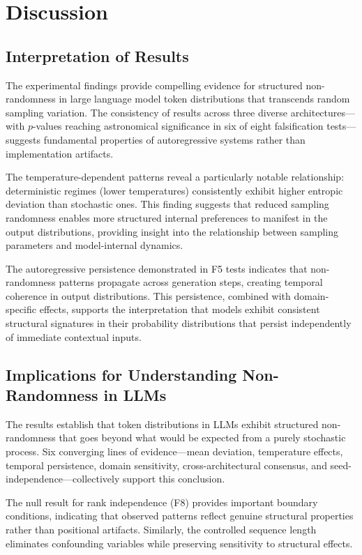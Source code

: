 \documentclass[12pt]{article}
\begin{document}
\section{Discussion}

\subsection{Interpretation of Results}

The experimental findings provide compelling evidence for structured non-randomness in large language model token distributions that transcends random sampling variation. The consistency of results across three diverse architectures---with $p$-values reaching astronomical significance in six of eight falsification tests---suggests fundamental properties of autoregressive systems rather than implementation artifacts.

The temperature-dependent patterns reveal a particularly notable relationship: deterministic regimes (lower temperatures) consistently exhibit higher entropic deviation than stochastic ones. This finding suggests that reduced sampling randomness enables more structured internal preferences to manifest in the output distributions, providing insight into the relationship between sampling parameters and model-internal dynamics.

The autoregressive persistence demonstrated in F5 tests indicates that non-randomness patterns propagate across generation steps, creating temporal coherence in output distributions. This persistence, combined with domain-specific effects, supports the interpretation that models exhibit consistent structural signatures in their probability distributions that persist independently of immediate contextual inputs.

\subsection{Implications for Understanding Non-Randomness in LLMs}

The results establish that token distributions in LLMs exhibit structured non-randomness that goes beyond what would be expected from a purely stochastic process. Six converging lines of evidence---mean deviation, temperature effects, temporal persistence, domain sensitivity, cross-architectural consensus, and seed-independence---collectively support this conclusion.

The null result for rank independence (F8) provides important boundary conditions, indicating that observed patterns reflect genuine structural properties rather than positional artifacts. Similarly, the controlled sequence length eliminates confounding variables while preserving sensitivity to structural effects.
\end{document}
